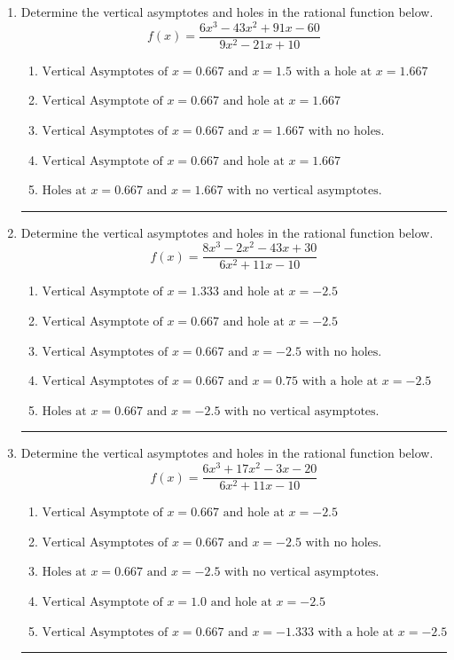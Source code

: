 \documentclass[14pt]{extbook}
\newcommand{\litem}[1]{\item#1\hspace*{-1cm}\rule{\textwidth}{0.4pt}}
\begin{document}
\begin{enumerate}
{\begin{enumerate}[label=\Alph*.]
\end{enumerate} }
\litem{
Determine the vertical asymptotes and holes in the rational function below.\[ f(x) = \frac{6x^{3} -43 x^{2} +91 x -60}{9x^{2} -21 x + 10} \]\begin{enumerate}[label=\Alph*.]
\item \( \text{Vertical Asymptotes of } x = 0.667 \text{ and } x = 1.5 \text{ with a hole at } x = 1.667 \)
\item \( \text{Vertical Asymptote of } x = 0.667 \text{ and hole at } x = 1.667 \)
\item \( \text{Vertical Asymptotes of } x = 0.667 \text{ and } x = 1.667 \text{ with no holes.} \)
\item \( \text{Vertical Asymptote of } x = 0.667 \text{ and hole at } x = 1.667 \)
\item \( \text{Holes at } x = 0.667 \text{ and } x = 1.667 \text{ with no vertical asymptotes.} \)

\end{enumerate} }
\litem{
Determine the vertical asymptotes and holes in the rational function below.\[ f(x) = \frac{8x^{3} -2 x^{2} -43 x + 30}{6x^{2} +11 x -10} \]\begin{enumerate}[label=\Alph*.]
\item \( \text{Vertical Asymptote of } x = 1.333 \text{ and hole at } x = -2.5 \)
\item \( \text{Vertical Asymptote of } x = 0.667 \text{ and hole at } x = -2.5 \)
\item \( \text{Vertical Asymptotes of } x = 0.667 \text{ and } x = -2.5 \text{ with no holes.} \)
\item \( \text{Vertical Asymptotes of } x = 0.667 \text{ and } x = 0.75 \text{ with a hole at } x = -2.5 \)
\item \( \text{Holes at } x = 0.667 \text{ and } x = -2.5 \text{ with no vertical asymptotes.} \)

\end{enumerate} }
\litem{
Determine the vertical asymptotes and holes in the rational function below.\[ f(x) = \frac{6x^{3} +17 x^{2} -3 x -20}{6x^{2} +11 x -10} \]\begin{enumerate}[label=\Alph*.]
\item \( \text{Vertical Asymptote of } x = 0.667 \text{ and hole at } x = -2.5 \)
\item \( \text{Vertical Asymptotes of } x = 0.667 \text{ and } x = -2.5 \text{ with no holes.} \)
\item \( \text{Holes at } x = 0.667 \text{ and } x = -2.5 \text{ with no vertical asymptotes.} \)
\item \( \text{Vertical Asymptote of } x = 1.0 \text{ and hole at } x = -2.5 \)
\item \( \text{Vertical Asymptotes of } x = 0.667 \text{ and } x = -1.333 \text{ with a hole at } x = -2.5 \)


\end{enumerate}}
\end{enumerate}
\end{document}
